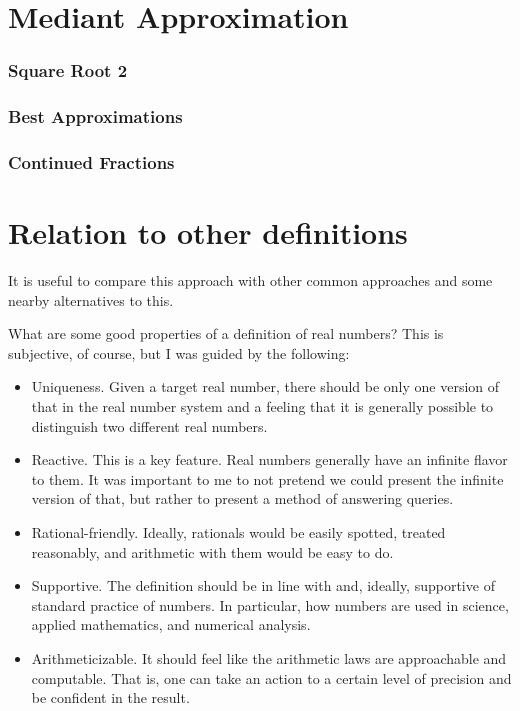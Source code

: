 \documentclass[12pt]{article}
\theoremstyle{remark}
\begin{document}
\section{Mediant Approximation}

\subsubsection{Square Root 2}

\subsubsection{Best Approximations}

\subsubsection{Continued Fractions}



\section{Relation to other definitions}

It is useful to compare this approach with other common approaches and some nearby alternatives to this. 

What are some good properties of a definition of real numbers? This is subjective, of course, but I was guided by the following: 

\begin{itemize}
    \item Uniqueness. Given a target real number, there should be only one version of that in the real number system and a feeling that it is generally possible to distinguish two different real numbers. 
    \item Reactive. This is a key feature. Real numbers generally have an infinite flavor to them. It was important to me to not pretend we could present the infinite version of that, but rather to present a method of answering queries. 
    \item Rational-friendly. Ideally, rationals would be easily spotted, treated reasonably, and arithmetic with them would be easy to do. 
    \item Supportive. The definition should be in line with and, ideally, supportive of standard practice of numbers. In particular, how numbers are used in science, applied mathematics, and numerical analysis. 
    \item Arithmeticizable. It should feel like the arithmetic laws are approachable and computable. That is, one can take an action to a certain level of precision and be confident in the result.
\end{itemize}
\end{document}
